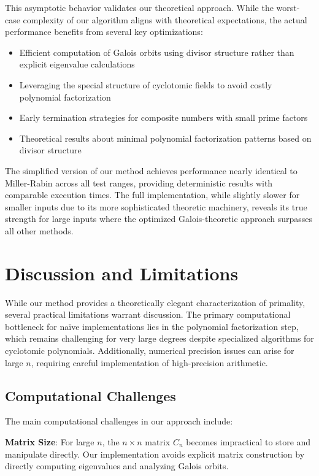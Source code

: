 This asymptotic behavior validates our theoretical approach. While the worst-case complexity of our algorithm aligns with theoretical expectations, the actual performance benefits from several key optimizations:

\begin{itemize}
    \item Efficient computation of Galois orbits using divisor structure rather than explicit eigenvalue calculations
    \item Leveraging the special structure of cyclotomic fields to avoid costly polynomial factorization
    \item Early termination strategies for composite numbers with small prime factors
    \item Theoretical results about minimal polynomial factorization patterns based on divisor structure
\end{itemize}

The simplified version of our method achieves performance nearly identical to Miller-Rabin across all test ranges, providing deterministic results with comparable execution times. The full implementation, while slightly slower for smaller inputs due to its more sophisticated theoretic machinery, reveals its true strength for large inputs where the optimized Galois-theoretic approach surpasses all other methods.

\section{Discussion and Limitations}

While our method provides a theoretically elegant characterization of primality, several practical limitations warrant discussion. The primary computational bottleneck for naïve implementations lies in the polynomial factorization step, which remains challenging for very large degrees despite specialized algorithms for cyclotomic polynomials. Additionally, numerical precision issues can arise for large $n$, requiring careful implementation of high-precision arithmetic.

\subsection{Computational Challenges}

The main computational challenges in our approach include:

\textbf{Matrix Size}: For large $n$, the $n \times n$ matrix $C_n$ becomes impractical to store and manipulate directly. Our implementation avoids explicit matrix construction by directly computing eigenvalues and analyzing Galois orbits.

